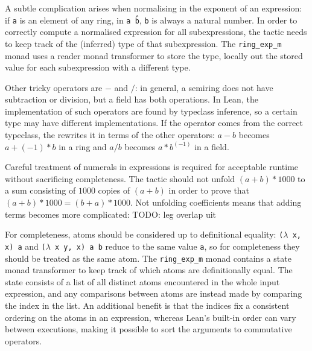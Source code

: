 \documentclass{llncs}
\newcommand{\lean}[1]{\texttt{#1}\xspace} %
\newcommand{\ringexp}{\lean{ring\_exp}}
\begin{document}
A subtle complication arises when normalising in the exponent of an expression:
if \lean{a} is an element of any ring, in \lean{a \^ b}, \lean{b} is always a natural number.
In order to correctly compute a normalised expression for all subexpressions,
the tactic needs to keep track of the (inferred) type of that subexpression.
The \lean{ring\_exp\_m} monad uses a reader monad transformer to store the type,
locally out the stored value for each subexpression with a different type.

Other tricky operators are $-$ and $/$:
in general, a semiring does not have subtraction or division,
but a field has both operations.
In Lean, the implementation of such operators are found by typeclass inference,
so a certain type may have different implementations.
If the operator comes from the correct typeclass,
the rewrites it in terms of the other operators:
$a - b$ becomes $a + (-1) * b$ in a ring
and $a / b$ becomes $a * b^(-1)$ in a field.

Careful treatment of numerals in expressions is required for acceptable runtime without sacrificing completeness.
The tactic should not unfold $(a + b) * 1000$ to a sum consisting of $1000$ copies of $(a + b)$
in order to prove that $(a + b) * 1000 = (b + a) * 1000$.
Not unfolding coefficients means that adding terms becomes more complicated:
TODO: leg overlap uit

For completeness, atoms should be considered up to definitional equality:
\lean{($\lambda$ x, x) a} and \lean{($\lambda$ x y, x) a b} reduce to the same value \lean{a},
so for completeness they should be treated as the same atom.
The \lean{ring\_exp\_m} monad contains a state monad transformer to keep track of which atoms are definitionally equal.
The state consists of a list of all distinct atoms encountered in the whole input expression,
and any comparisons between atoms are instead made by comparing the index in the list.
An additional benefit is that the indices fix a consistent ordering on the atoms in an expression,
whereas Lean's built-in order can vary between executions,
making it possible to sort the arguments to commutative operators.
\end{document}
